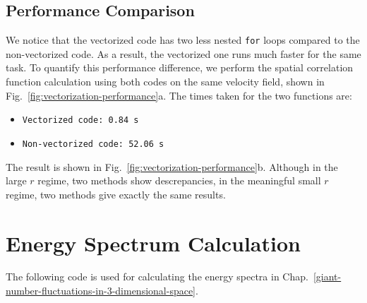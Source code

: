 \subsection{Performance Comparison}
We notice that the vectorized code has two less nested \texttt{for} loops compared to the non-vectorized code. As a result, the vectorized one runs much faster for the same task. To quantify this performance difference, we perform the spatial correlation function calculation using both codes on the same velocity field, shown in Fig.~\ref{fig:vectorization-performance}a. The times taken for the two functions are:
\begin{itemize}
  \item \texttt{Vectorized code: 0.84 s}
  \item \texttt{Non-vectorized code: 52.06 s}
\end{itemize}
The result is shown in Fig.~\ref{fig:vectorization-performance}b. Although in the large $r$ regime, two methods show descrepancies, in the meaningful small $r$ regime, two methods give exactly the same results.


\section{Energy Spectrum Calculation}
\label{sec:A-energy-spectra}
The following code is used for calculating the energy spectra in Chap.~\ref{giant-number-fluctuations-in-3-dimensional-space}.

